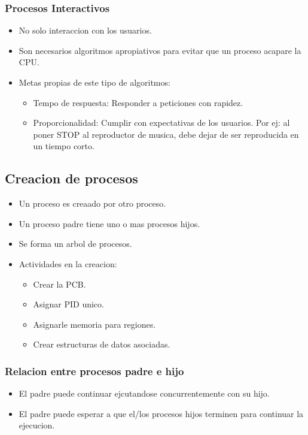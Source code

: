 \subsubsection{Procesos Interactivos}
\begin{itemize}
    \item No solo interaccion con los usuarios.
    \item Son necesarios algoritmos apropiativos para evitar que un proceso acapare la CPU.
    \item Metas propias de este tipo de algoritmos:
    \begin{itemize}
        \item Tempo de respuesta: Responder a peticiones con rapidez.
        \item Proporcionalidad: Cumplir con expectativas de los usuarios. Por ej: al poner STOP al reproductor de musica, debe dejar de ser reproducida en un tiempo corto.
    \end{itemize}
\end{itemize}

\subsection{Creacion de procesos}
\begin{itemize}
    \item Un proceso es creaado por otro proceso.
    \item Un proceso padre tiene uno o mas procesos hijos.
    \item Se forma un arbol de procesos.
    \item Actividades en la creacion:
    \begin{itemize}
        \item Crear la PCB.
        \item Asignar PID unico.
        \item Asignarle memoria para regiones.
        \item Crear estructuras de datos asociadas.
    \end{itemize}
\end{itemize}

\subsubsection{Relacion entre procesos padre e hijo}
\begin{itemize}
    \item El padre puede continuar ejcutandose concurrentemente con su hijo.
    \item El padre puede esperar a que el/los procesos hijos terminen para continuar la ejecucion.
\end{itemize}
